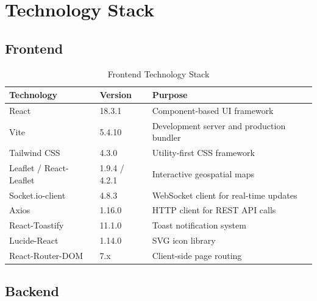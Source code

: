 \documentclass[12pt, a4paper]{report}
\begin{document}
\chapter{Technology Stack}

\section{Frontend}

\begin{table}[H]
  \centering
  \caption{Frontend Technology Stack}
  \begin{tabularx}{\textwidth}{l l X}
    \toprule
    \rowcolor{headerrow!20}
    \textbf{Technology} & \textbf{Version} & \textbf{Purpose} \\
    \midrule
    React                  & 18.3.1     & Component-based UI framework \\
    \rowcolor{rowshade}
    Vite                   & 5.4.10     & Development server and production bundler \\
    Tailwind CSS           & 4.3.0      & Utility-first CSS framework \\
    \rowcolor{rowshade}
    Leaflet / React-Leaflet & 1.9.4 / 4.2.1 & Interactive geospatial maps \\
    Socket.io-client       & 4.8.3      & WebSocket client for real-time updates \\
    \rowcolor{rowshade}
    Axios                  & 1.16.0     & HTTP client for REST API calls \\
    React-Toastify         & 11.1.0     & Toast notification system \\
    \rowcolor{rowshade}
    Lucide-React           & 1.14.0     & SVG icon library \\
    React-Router-DOM       & 7.x        & Client-side page routing \\
    \bottomrule
  \end{tabularx}
\end{table}

\section{Backend}
\end{document}
